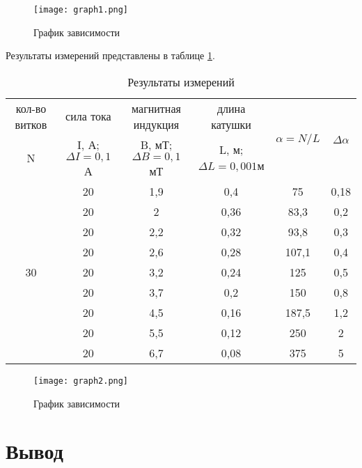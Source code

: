 \documentclass[12pt,a4paper]{article}
\begin{document}
\begin{figure}[h!]
	\centering
	\texttt{[image: graph1.png]}
	\caption{График зависимости }	
	\label{im:graph1}	
\end{figure}

Результаты измерений представлены в таблице \ref{tab:data2}. 
\begin{table}[h]
	\caption{Результаты измерений }
	\centering
	\label{tab:data2}
	\begin{tabular}{| c | c | c | c | c | c |} \hline
кол-во витков & сила тока & магнитная индукция & длина катушки &\multirow{2}{*}{$\alpha = N/L$} & \multirow{2}{*}{$\Delta\alpha$} \\ \cline{1-4}
N& I, А; $\Delta I = 0{,}1$А & B, мТ;  $\Delta B = 0{,}1$мТ	& L, м; $\Delta L = 0{,}001$м & & \\ \hline
\multirow{9}{*}{30} &20 & 1,9 &	0,4	 & 75	&  0,18 \\  \cline{2-6}
&20 & 2	 &  0,36 &	83,3  & 0,2                 \\  \cline{2-6}
&20 & 2,2 &	0,32 &	93,8  & 0,3                 \\  \cline{2-6}
&20 & 2,6 &	0,28 &	107,1 &	0,4                 \\  \cline{2-6}
&20 & 3,2 &	0,24 &	125	  & 0,5                 \\  \cline{2-6}
&20 & 3,7 &	0,2	 &	150	  & 0,8                 \\  \cline{2-6}
&20 & 4,5 &	0,16 &	187,5 &	1,2                 \\  \cline{2-6}
&20 & 5,5 &	0,12 &	250	  & 2                   \\  \cline{2-6}
&20 & 6,7 &	0,08 &	375	  & 5                   \\
		\hline
	\end{tabular}
\end{table}	

\begin{figure}[h!]
	\centering
	\texttt{[image: graph2.png]}
	\caption{График зависимости}	
	\label{im:graph2}	
\end{figure}


\section{Вывод}
\end{document}
